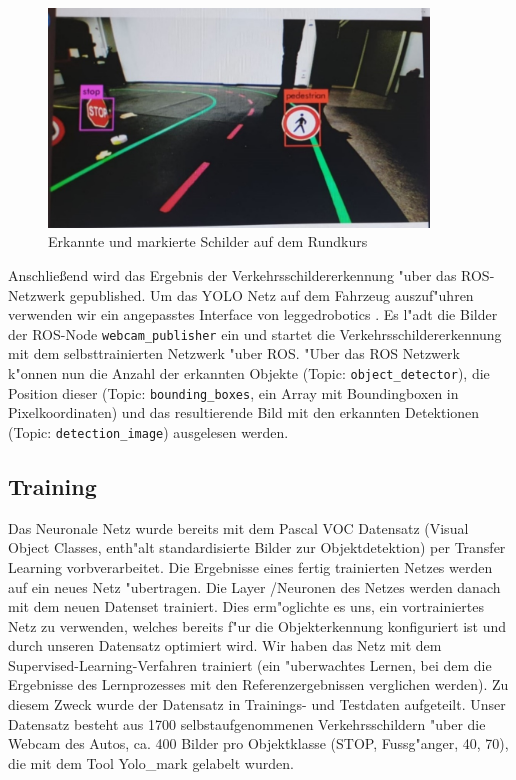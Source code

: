 \begin{figure}[h]
	\centering
	\includegraphics[width=0.9\textwidth,trim={0.5cm 1cm 1cm 1cm},clip]{images/boundingboxes}
	\caption{Erkannte und markierte Schilder auf dem Rundkurs}
	\label{fig:boundingboxes}
\end{figure}

Anschlie\ss end wird das Ergebnis der Verkehrsschildererkennung "uber das ROS-Netzwerk gepublished. Um das YOLO Netz auf dem Fahrzeug auszuf"uhren verwenden wir ein angepasstes Interface von leggedrobotics \cite{leggedrobotics}. Es l"adt die Bilder der ROS-Node \texttt{webcam\_publisher} ein und startet die Verkehrsschildererkennung mit dem selbsttrainierten Netzwerk "uber ROS. "Uber das ROS Netzwerk k"onnen nun die Anzahl der erkannten Objekte (Topic: \texttt{object\_detector}), die Position dieser (Topic: \texttt{bounding\_boxes}, ein Array mit Boundingboxen in Pixelkoordinaten) und das resultierende Bild mit den erkannten Detektionen (Topic: \texttt{detection\_image}) ausgelesen werden.

\subsection{Training}

Das Neuronale Netz wurde bereits mit dem Pascal VOC Datensatz (Visual Object Classes, enth"alt standardisierte Bilder zur Objektdetektion)
per Transfer Learning vorbverarbeitet. Die Ergebnisse eines fertig trainierten Netzes werden auf ein neues Netz "ubertragen. Die Layer /Neuronen des Netzes werden danach mit dem neuen Datenset trainiert.
Dies erm"oglichte es uns, ein vortrainiertes Netz zu verwenden, welches bereits f"ur die Objekterkennung konfiguriert ist und durch unseren Datensatz optimiert wird. Wir haben das Netz mit dem Supervised-Learning-Verfahren trainiert (ein "uberwachtes Lernen, bei dem die Ergebnisse des Lernprozesses mit den Referenzergebnissen verglichen werden).  Zu diesem Zweck wurde der Datensatz in Trainings- und Testdaten aufgeteilt. Unser Datensatz besteht aus 1700 selbstaufgenommenen Verkehrsschildern "uber die Webcam des Autos, ca. 400 Bilder pro Objektklasse (STOP, Fussg"anger, 40, 70), die mit dem Tool Yolo\_mark \cite{Yolo_mark} gelabelt wurden.

